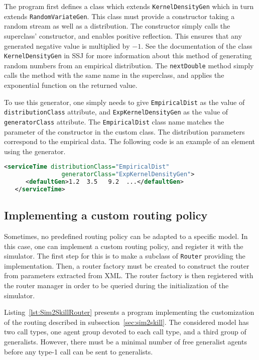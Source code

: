 The program first defines a class which extends
\texttt{Kernel\-Density\-Gen} which in turn extends
\texttt{Random\-Variate\-Gen}.
This class must provide a constructor taking
a random stream as well as a distribution.
The constructor simply calls the superclass' constructor, and enables
positive reflection.
This ensures that any generated negative value is multiplied by $-1$.
See the documentation of the class \texttt{Kernel\-Density\-Gen} in
SSJ for more information about this method of generating random
numbers from an empirical distribution.
The \texttt{next\-Double} method simply calls the method with the same
name in the superclass, and applies the exponential function on the
returned value.

To use this generator, one simply needs to give
\texttt{Empirical\-Dist} as the value of \texttt{distribu\-tion\-Class}
attribute,
and \texttt{Exp\-Kernel\-Density\-Gen} as the value of
\texttt{generator\-Class} attribute.
The \texttt{Empirical\-Dist} class name matches the parameter of the
constructor in the custom class.
The distribution parameters correspond to the empirical data.
The following code is an example of an element using the generator.
\begin{lstlisting}[language=XML]
   <serviceTime distributionClass="EmpiricalDist"
                generatorClass="ExpKernelDensityGen">
      <defaultGen>1.2  3.5   9.2  ...</defaultGen>
   </serviceTime>
\end{lstlisting}

\subsection{Implementing a custom routing policy}
\label{sec:mskCustomRouting}

Sometimes, no predefined routing policy can be adapted to a specific
model.
In this case, one can implement a custom routing policy, and register
it with the simulator.
The first step for this is to make a subclass of \texttt{Router}
providing the implementation.
Then, a router factory must be created to construct the router from
parameters extracted from XML.
The router factory is then registered with the router manager in order
to be queried during the initialization of the simulator.

Listing~\ref{lst:Sim2SkillRouter} presents a program implementing
the customization of the routing described in
subsection~\ref{sec:sim2skill}.
The considered model has two call types, one agent group devoted to
each call type, and a third group of generalists.
However, there must be a minimal number of free generalist agents
before any type-1 call can be sent to generalists.

